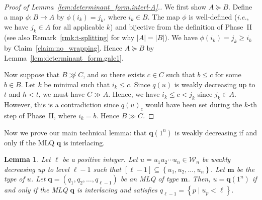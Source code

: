 \documentclass[reqno]{amsart}
\newcommand{\0}{\phantom{c}}
\newcommand{\mm}{\mathbf{m}}
\newcommand{\qq}{\mathbf{q}}
\newcommand{\mcW}{\mathcal{W}}
\newcommand{\set}[1]{\left\{ #1 \right\}}
\newcommand{\abs}[1]{\left| #1 \right|}
\newcommand{\tup}[1]{\left( #1 \right)}
\newcommand{\ive}[1]{\left[ #1 \right]}
\theoremstyle{plain}
\newtheorem{lemma}[thm]{Lemma}
\theoremstyle{definition}
\numberwithin{equation}{section}
\begin{document}
\begin{proof}[Proof of Lemma~\ref{lem:determinant_form.interl-A}.]
We first show $A \succeq B$.
Define a map $\phi \colon B \to A$ by $\phi(i_k) = j_k$, where $i_k \in B$.
The map $\phi$ is well-defined (\textit{i.e.}, we have $j_k \in A$ for all applicable $k$) and bijective from the definition of Phase~II (see also Remark~\ref{rmk:t-splitting} for why $\abs{A} = \abs{B}$).
We have $\phi(i_k) = j_k \geq i_k$ by Claim~\ref{claim:no_wrapping}.
Hence $A \succeq B$ by Lemma~\ref{lem:determinant_form.gale1}.

Now suppose that $B \not\gg C$, and so there exists $c \in C$ such that $b \leq c$ for some $b \in B$.
Let $k$ be minimal such that $i_k \leq c$.
Since $q(u)$ is weakly decreasing up to $t$ and $h < t$, we must have $C \gg A$.
Hence, we have $i_k \leq c < j_k$ since $j_k \in A$.
However, this is a contradiction since $q(u)_c$ would have been set during the $k$-th step of Phase~II, where $i_k = b$.
Hence $B \gg C$.
\end{proof}

Now we prove our main technical lemma: that $\qq(1^n)$ is weakly decreasing if and only if the MLQ $\qq$ is interlacing.

\begin{lemma}
\label{lem:determinant_form.interl-act}
Let $\ell$ be a positive integer.
Let $u = u_1 u_2 \dotsm u_n \in \mcW_n$ be weakly decreasing up to level $\ell-1$ such that $\ive{\ell-1} \subseteq \set{u_1, u_2, \dotsc, u_n}$.
Let $\mm$ be the type of $u$.
Let $\qq = \tup{q_1, q_2, \dotsc, q_{\ell-1}}$ be an MLQ of type $\mm$.
Then, $u = \qq(1^n)$ if and only if the MLQ $\qq$ is interlacing and satisfies $q_{\ell-1} = \set{ p \mid u_p < \ell }$.
\end{lemma}
\end{document}
